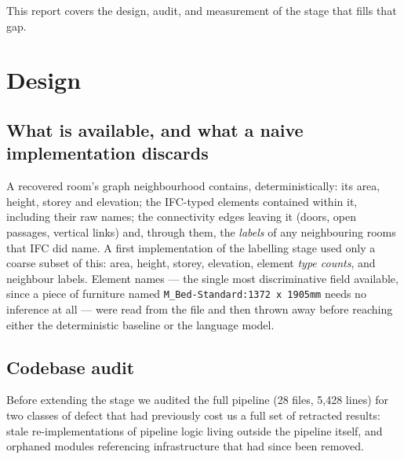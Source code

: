 \documentclass[11pt,a4paper]{article}
\begin{document}
This report covers the design, audit, and measurement of the stage that fills
that gap.

\section{Design}

\subsection{What is available, and what a naive implementation discards}

A recovered room's graph neighbourhood contains, deterministically: its area,
height, storey and elevation; the IFC-typed elements contained within it,
including their raw names; the connectivity edges leaving it (doors, open
passages, vertical links) and, through them, the \emph{labels} of any
neighbouring rooms that IFC did name. A first implementation of the labelling
stage used only a coarse subset of this: area, height, storey, elevation,
element \emph{type counts}, and neighbour labels. Element names --- the single
most discriminative field available, since a piece of furniture named
\texttt{M\_Bed-Standard:1372\,x\,1905mm} needs no inference at all --- were
read from the file and then thrown away before reaching either the
deterministic baseline or the language model.

\subsection{Codebase audit}

Before extending the stage we audited the full pipeline (28 files, 5{,}428
lines) for two classes of defect that had previously cost us a full set of
retracted results: stale re-implementations of pipeline logic living outside
the pipeline itself, and orphaned modules referencing infrastructure that had
since been removed.
\end{document}

